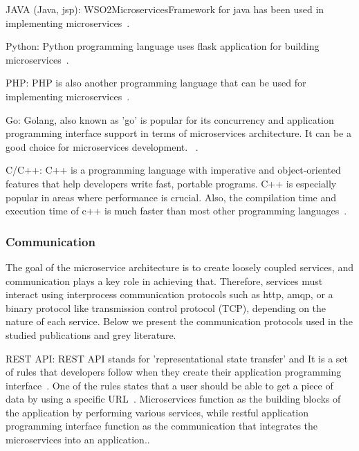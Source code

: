 \par JAVA (Java, jsp): WSO2MicroservicesFramework for java has been used in implementing microservices~\cite{Sharaf2019, khan2020, KalskeM2017, Venugopal2017}.

\par Python: Python programming language uses flask application for building microservices~\cite{Ghebremicael2017, khan2020, Hou2020}.

\par PHP: PHP is also another programming language that can be used for implementing microservices~\cite{McElhiney2018}.

\par Go: Golang, also known as 'go' is popular for its concurrency and application programming interface support in terms of microservices architecture. It can be a good choice for microservices development. ~\cite{liu2018}.

\par C/C++: C++ is a programming language with imperative and object-oriented features that help developers write fast, portable programs. C++ is especially popular in areas where performance is crucial. Also, the compilation time and execution time of c++ is much faster than most other programming languages~\cite{Ghebremicael2017}. 


\subsubsection{Communication}

The goal of the microservice architecture is to create loosely coupled services, and communication plays a key role in achieving that. Therefore, services must interact using interprocess communication protocols such as http, amqp, or a binary protocol like transmission control protocol (TCP), depending on the nature of each service. Below we present the communication protocols used in the studied publications and grey literature.

\par REST API: REST API stands for 'representational state transfer' and It is a set of rules that developers follow when they create their application programming interface~\cite{Ndungu2019, Zhang2019}. One of the rules states that a user should be able to get a piece of data by using a specific URL~\cite{Koschel2017, Branko2018}. Microservices function as the building blocks of the application by performing various services, while restful application programming interface function as the communication that integrates the microservices into an application.\cite{liu2018, Zaytev2018, chauvel2018, Johansson2019}.

